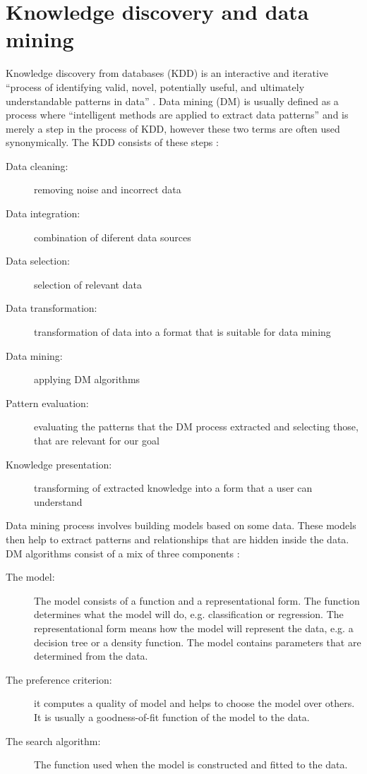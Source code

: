 \documentclass[thesis=B,english]{FITthesis}[2012/10/20]
\begin{document}
\chapter{Knowledge discovery and data mining}
\label{chap:DM}
Knowledge discovery from databases (KDD) is an interactive and iterative ``process of identifying valid, novel, potentially useful, and ultimately understandable patterns in data'' \cite{andrassyova1999knowledge,Fayyad96thekdd}. Data mining (DM) is usually defined as a process where ``intelligent methods are applied to extract data patterns'' \cite{han2006data} and is merely a step in the process of KDD, however these two terms are often used synonymically. The KDD consists of these steps \cite{han2006data}:
\begin{description}
	\item[Data cleaning:] removing noise and incorrect data
	\item[Data integration:] combination of diferent data sources
	\item[Data selection:] selection of relevant data
	\item[Data transformation:] transformation of data into a format that is suitable for data mining
	\item[Data mining:] applying DM algorithms
	\item[Pattern evaluation:] evaluating the patterns that the DM process extracted and selecting those, that are relevant for our goal
	\item[Knowledge presentation:] transforming of extracted knowledge into a form that a user can understand
\end{description}

Data mining process involves building models based on some data. These models then help to extract patterns and relationships that are hidden inside the data. DM algorithms consist of a mix of three components \cite{Fayyad96thekdd}:
\begin{description}
\item [The model:] The model consists of a function and a representational form. The function determines what the model will do, e.g. classification or regression. The representational form means how the model will represent the data, e.g. a decision tree or a density function. The model contains parameters that are determined from the data.
\item [The preference criterion:] it computes a quality of model and helps to choose the model over others. It is usually a goodness-of-fit function of the model to the data.
\item [The search algorithm:] The function used when the model is constructed and fitted to the data.
\end{description}
\end{document}
